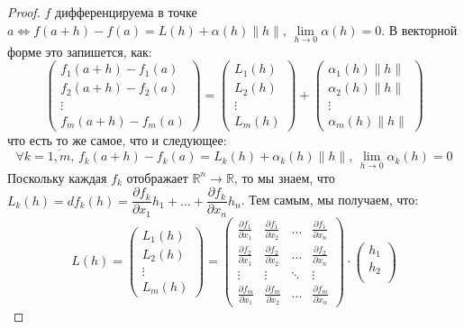 \documentclass[12pt]{article}
\newcommand{\MR}{\mathbb{R}}
\theoremstyle{definition}
\begin{document}
\begin{proof}
	$f$ дифференцируема в точке $a \Leftrightarrow f(a+h) - f(a) = L(h) + \alpha(h)\|h\|, \, \lim\limits_{h \to 0} \alpha(h) = 0$. В векторной форме это запишется, как:
	$$
		\begin{pmatrix}
			f_1(a+h) - f_1(a)\\
			f_2(a+h) - f_2(a)\\
			\vdots\\
			f_m(a+h) - f_m(a)
		\end{pmatrix} = 
		\begin{pmatrix}
			L_1(h)\\
			L_2(h)\\
			\vdots\\
			L_m(h)
		\end{pmatrix} + 
		\begin{pmatrix}
			\alpha_1(h)\|h\|\\
			\alpha_2(h)\|h\|\\
			\vdots\\
			\alpha_m(h)\|h\|
		\end{pmatrix}
	$$
	что есть то же самое, что и следующее:
	$$
		\forall k = \overline{1,m},\, f_k(a+h) - f_k(a) = L_k(h) + \alpha_k(h)\|h\|, \, \lim\limits_{h \to 0} \alpha_k(h) = 0
	$$
	Поскольку каждая $f_k$ отображает $\MR^n \to \MR$, то мы знаем, что $L_k(h) = df_k(h) = \dfrac{\partial f_k}{\partial x_1}h_1 + \dotsc + \dfrac{\partial f_k}{\partial x_n}h_n$. Тем самым, мы получаем, что:
	$$
		L(h) = 	
		\begin{pmatrix}
			L_1(h)\\
			L_2(h)\\
			\vdots\\
			L_m(h)
		\end{pmatrix} = 
		\begin{pmatrix}
			\tfrac{\partial f_1}{\partial x_1} & \tfrac{\partial f_1}{\partial x_2} & \dotsc & \tfrac{\partial f_1}{\partial x_n} \\
			\tfrac{\partial f_2}{\partial x_1} & \tfrac{\partial f_2}{\partial x_2} & \dotsc & \tfrac{\partial f_2}{\partial x_n} \\
			\vdots & \vdots & \ddots & \vdots \\
			\tfrac{\partial f_m}{\partial x_1} & \tfrac{\partial f_m }{\partial x_2} & \dotsc & \tfrac{\partial f_m}{\partial x_n} 			
		\end{pmatrix}{\cdot}
		\begin{pmatrix}
			h_1\\
			h_2\\

\end{pmatrix}$$
\end{proof}
\end{document}
